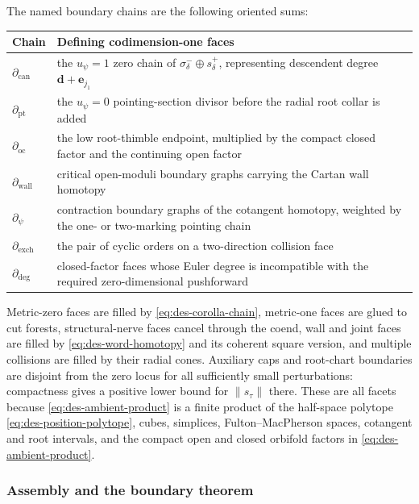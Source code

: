 The named boundary chains are the following oriented sums:
\begin{center}
\begin{tabularx}{\textwidth}{@{}>{\raggedright\arraybackslash}p{}X@{}}
\toprule
Chain & Defining codimension-one faces \\
\midrule
$\partial_{\mathrm{can}}$ & the $u_\psi=1$ zero chain of $\sigma_\delta^-\oplus s_\delta^+$, representing descendent degree $\mathbf d+\mathbf e_{j_1}$ \\
$\partial_{\mathrm{pt}}$ & the $u_\psi=0$ pointing-section divisor before the radial root collar is added \\
$\partial_{\mathrm{oc}}$ & the low root-thimble endpoint, multiplied by the compact closed factor and the continuing open factor \\
$\partial_{\mathrm{wall}}$ & critical open-moduli boundary graphs carrying the Cartan wall homotopy \\
$\partial_{\psi}$ & contraction boundary graphs of the cotangent homotopy, weighted by the one- or two-marking pointing chain \\
$\partial_{\mathrm{exch}}$ & the pair of cyclic orders on a two-direction collision face \\
$\partial_{\mathrm{deg}}$ & closed-factor faces whose Euler degree is incompatible with the required zero-dimensional pushforward \\
\bottomrule
\end{tabularx}
\end{center}
Metric-zero faces are filled by
\eqref{eq:des-corolla-chain}, metric-one faces are glued to cut forests,
structural-nerve faces cancel through the coend, wall and joint faces are
filled by \eqref{eq:des-word-homotopy} and its coherent square version, and
multiple collisions are filled by their radial cones.  Auxiliary caps and
root-chart boundaries are disjoint from the zero locus for all sufficiently
small perturbations: compactness gives a positive lower bound for
$\lVert s_\tau\rVert$ there.  These are all facets because
\eqref{eq:des-ambient-product} is a finite product of the half-space
polytope \eqref{eq:des-position-polytope}, cubes, simplices,
Fulton--MacPherson spaces, cotangent and root intervals, and the compact open
and closed orbifold factors in \eqref{eq:des-ambient-product}.

\subsubsection{Assembly and the boundary theorem}

